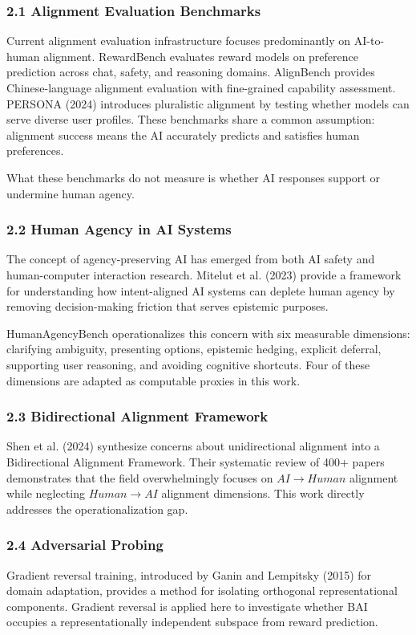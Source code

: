 
\subsubsection{2.1 Alignment Evaluation Benchmarks}

Current alignment evaluation infrastructure focuses predominantly on AI-to-human alignment. RewardBench \citep{Lambert2024} evaluates reward models on preference prediction across chat, safety, and reasoning domains. AlignBench \citep{AlignBench2024} provides Chinese-language alignment evaluation with fine-grained capability assessment. PERSONA (2024) introduces pluralistic alignment by testing whether models can serve diverse user profiles. These benchmarks share a common assumption: alignment success means the AI accurately predicts and satisfies human preferences.

What these benchmarks do not measure is whether AI responses support or undermine human agency.

\subsubsection{2.2 Human Agency in AI Systems}

The concept of agency-preserving AI has emerged from both AI safety and human-computer interaction research. Mitelut et al. (2023) provide a framework for understanding how intent-aligned AI systems can deplete human agency by removing decision-making friction that serves epistemic purposes.

HumanAgencyBench \citep{HumanAgencyBench2024} operationalizes this concern with six measurable dimensions: clarifying ambiguity, presenting options, epistemic hedging, explicit deferral, supporting user reasoning, and avoiding cognitive shortcuts. Four of these dimensions are adapted as computable proxies in this work.

\subsubsection{2.3 Bidirectional Alignment Framework}

Shen et al. (2024) synthesize concerns about unidirectional alignment into a Bidirectional Alignment Framework. Their systematic review of 400+ papers demonstrates that the field overwhelmingly focuses on $AI\rightarrow Human$ alignment while neglecting $Human\rightarrow AI$ alignment dimensions. This work directly addresses the operationalization gap.

\subsubsection{2.4 Adversarial Probing}

Gradient reversal training, introduced by Ganin and Lempitsky (2015) for domain adaptation, provides a method for isolating orthogonal representational components. Gradient reversal is applied here to investigate whether BAI occupies a representationally independent subspace from reward prediction.
